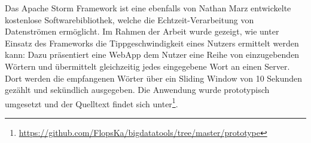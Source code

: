 \documentclass[a4paper,11pt]{scrartcl}
\begin{document}
  Das Apache Storm Framework ist eine ebenfalls von Nathan Marz entwickelte
  kostenlose Softwarebibliothek, welche die Echtzeit-Verarbeitung von
  Datenströmen ermöglicht. Im Rahmen der Arbeit wurde gezeigt, wie unter
  Einsatz des Frameworks die Tippgeschwindigkeit eines Nutzers ermittelt werden
  kann: Dazu präsentiert eine WebApp dem Nutzer eine Reihe von einzugebenden
  Wörtern und übermittelt gleichzeitig jedes eingegebene Wort an einen Server.
  Dort werden die empfangenen Wörter über ein Sliding Window von 10 Sekunden
  gezählt und sekündlich ausgegeben. Die Anwendung wurde prototypisch umgesetzt
  und der Quelltext findet sich
  unter\footnote{\url{https://github.com/FlopsKa/bigdatatools/tree/master/prototype}}.

  \newpage
  
  

  
\end{document}
